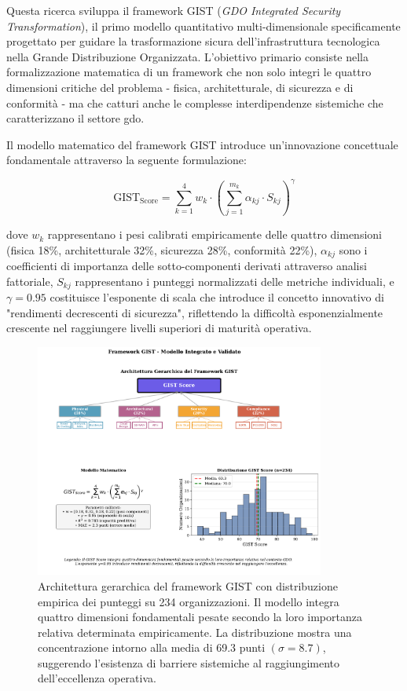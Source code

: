 Questa ricerca sviluppa il framework GIST (\textit{GDO Integrated Security Transformation}), il primo modello quantitativo multi-dimensionale specificamente progettato per guidare la trasformazione sicura dell'infrastruttura tecnologica nella Grande Distribuzione Organizzata. L'obiettivo primario consiste nella formalizzazione matematica di un framework che non solo integri le quattro dimensioni critiche del problema - fisica, architetturale, di sicurezza e di conformità - ma che catturi anche le complesse interdipendenze sistemiche che caratterizzano il settore \gls{gdo}.

Il modello matematico del framework GIST introduce un'innovazione concettuale fondamentale attraverso la seguente formulazione:

\begin{equation}
\text{GIST}_{\text{Score}} = \sum_{k=1}^{4} w_k \cdot \left( \sum_{j=1}^{m_k} \alpha_{kj} \cdot S_{kj} \right)^{\gamma}
\label{eq:gist_score}
\end{equation}

dove $w_k$ rappresentano i pesi calibrati empiricamente delle quattro dimensioni (fisica 18\%, architetturale 32\%, sicurezza 28\%, conformità 22\%), $\alpha_{kj}$ sono i coefficienti di importanza delle sotto-componenti derivati attraverso analisi fattoriale, $S_{kj}$ rappresentano i punteggi normalizzati delle metriche individuali, e $\gamma = 0.95$ costituisce l'esponente di scala che introduce il concetto innovativo di "rendimenti decrescenti di sicurezza", riflettendo la difficoltà esponenzialmente crescente nel raggiungere livelli superiori di maturità operativa.

\begin{figure}[htbp]
\centering
\includegraphics[width=0.85\textwidth]{thesis_figures/cap5/figura_5_3_gist_framework.pdf}
\caption[Architettura gerarchica del framework GIST e distribuzione empirica dei punteggi]{Architettura gerarchica del framework GIST con distribuzione empirica dei punteggi su 234 organizzazioni. Il modello integra quattro dimensioni fondamentali pesate secondo la loro importanza relativa determinata empiricamente. La distribuzione mostra una concentrazione intorno alla media di 69.3 punti $(\sigma=8.7)$, suggerendo l'esistenza di barriere sistemiche al raggiungimento dell'eccellenza operativa.}
\label{fig:gist_framework}
\end{figure}

